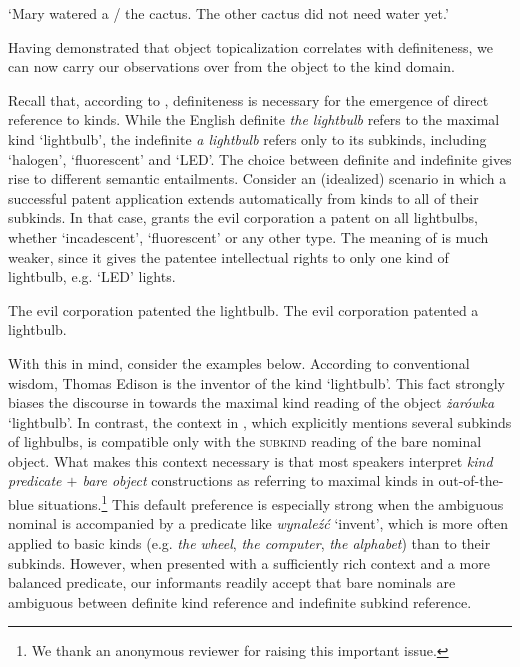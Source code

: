 \documentclass[output=paper]{langscibook}
\begin{document}
\glt `Mary watered a / the cactus. The other cactus did not need water yet.'\\ \label{ex:cactus_2}

\z\z

\noindent
Having demonstrated that object topicalization correlates with definiteness, we can now carry our observations over from the object to the kind domain.

Recall that, according to \citet{Borik.Espinal2012, Borik.Espinal2015}, definiteness is necessary for the emergence of direct reference to kinds. While the English definite \textit{the lightbulb} refers to the maximal kind `lightbulb', the indefinite \textit{a lightbulb} refers only to its subkinds, including `halogen', `fluorescent' and `LED'. The choice between definite and indefinite gives rise to different semantic entailments. Consider an (idealized) scenario in which a successful patent application extends automatically from kinds to all of their subkinds. In that case,  grants the evil corporation a patent on all lightbulbs, whether `incadescent', `fluorescent' or any other type. The meaning of  is much weaker, since it gives the patentee intellectual rights to only one kind of lightbulb, e.g. `LED' lights.

\ea \label{ex:lightbulb_eng}
\ea The evil corporation patented the lightbulb. \label{ex:lightbulb_eng_1}
\ex The evil corporation patented a lightbulb.\label{ex:lightbulb_eng_2}
\z \z

\noindent
With this in mind, consider the  examples below. According to conventional wisdom, Thomas Edison is the inventor of the kind `lightbulb'. This fact strongly biases the discourse in  towards the maximal kind reading of the object \textit{żarówka} `lightbulb'. In contrast, the context in , which explicitly mentions several subkinds of lighbulbs, is compatible only with the \textsc{subkind} reading of the bare nominal object. What makes this context necessary is that most  speakers interpret \textit{kind predicate $+$ bare object} constructions as referring to maximal kinds in out-of-the-blue situations.\footnote{We thank an anonymous reviewer for raising this important issue.} This default preference is especially strong when the ambiguous nominal is accompanied by a predicate like \textit{wynaleźć} `invent', which is more often applied to basic kinds (e.g. \textit{the wheel}, \textit{the computer}, \textit{the alphabet}) than to their subkinds. However, when presented with a sufficiently rich context and a more balanced predicate, our informants readily accept that  bare nominals are ambiguous between definite kind reference and indefinite subkind reference.
\end{document}
